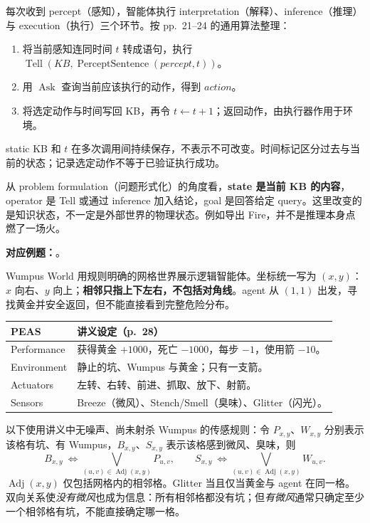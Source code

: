 
每次收到 percept（感知），智能体执行 interpretation（解释）、inference（推理）与 execution（执行）三个环节。按 pp.~21--24 的通用算法整理：
\begin{enumerate}
  \item 将当前感知连同时间 $t$ 转成语句，执行 $\operatorname{Tell}(KB,\operatorname{PerceptSentence}(percept,t))$。
  \item 用 $\operatorname{Ask}$ 查询当前应该执行的动作，得到 $action$。
  \item 将选定动作与时间写回 KB，再令 $t\leftarrow t+1$；返回动作，由执行器作用于环境。
\end{enumerate}
static KB 和 $t$ 在多次调用间持续保存，不表示不可改变。时间标记区分过去与当前的状态；记录选定动作不等于已验证执行成功。

从 problem formulation（问题形式化）的角度看，\textbf{state 是当前 KB 的内容}，operator 是 Tell 或通过 inference 加入结论，goal 是回答给定 query。这里改变的是知识状态，不一定是外部世界的物理状态。例如导出 Fire，并不是推理本身点燃了一场火。

\textbf{对应例题：}。


Wumpus World 用规则明确的网格世界展示逻辑智能体。坐标统一写为 $(x,y)$：$x$ 向右、$y$ 向上；\textbf{相邻只指上下左右，不包括对角线}。agent 从 $(1,1)$ 出发，寻找黄金并安全返回，但不能直接看到完整危险分布。

\begin{center}
\begin{tabularx}{\textwidth}{@{}lX@{}}
  \toprule
  PEAS & 讲义设定（p.~28） \\
  \midrule
  Performance & 获得黄金 $+1000$，死亡 $-1000$，每步 $-1$，使用箭 $-10$。 \\
  Environment & 静止的坑、Wumpus 与黄金；只有一支箭。 \\
  Actuators & 左转、右转、前进、抓取、放下、射箭。 \\
  Sensors & Breeze（微风）、Stench/Smell（臭味）、Glitter（闪光）。 \\
  \bottomrule
\end{tabularx}
\end{center}

以下使用讲义中无噪声、尚未射杀 Wumpus 的传感规则：令 $P_{x,y}$、$W_{x,y}$ 分别表示该格有坑、有 Wumpus，$B_{x,y}$、$S_{x,y}$ 表示该格感到微风、臭味，则
\[
  B_{x,y}\ \Longleftrightarrow\!
    \bigvee_{(u,v)\in\operatorname{Adj}(x,y)}P_{u,v},
  \qquad
  S_{x,y}\ \Longleftrightarrow\!
    \bigvee_{(u,v)\in\operatorname{Adj}(x,y)}W_{u,v}.
\]
$\operatorname{Adj}(x,y)$ 仅包括网格内的相邻格。Glitter 当且仅当黄金与 agent 在同一格。双向关系使\emph{没有微风}也成为信息：所有相邻格都没有坑；但\emph{有微风}通常只确定至少一个相邻格有坑，不能直接确定哪一格。


